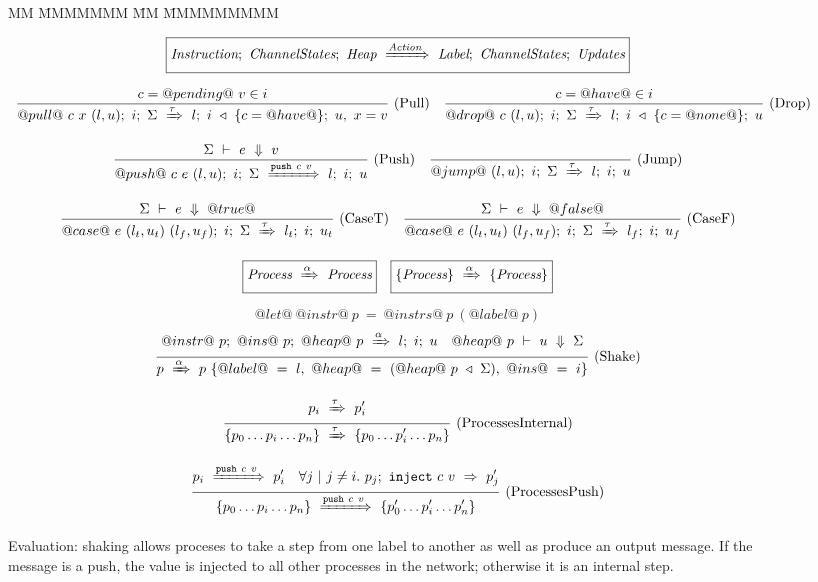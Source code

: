 \begin{figure}
\begin{tabbing}
MM \= MMMMMMM \= MM \= MMMMMMMMM\kill
\end{tabbing}

$$
  \boxed{
    \ProcBlockShake
      {\Instr}
      {\ChannelStates}
      {\Heap}
      {\Action}
      {\Label}
      {\ChannelStates}
      {\Updates}
  }
$$


$$
\ruleIN{
  c=@pending@~v \in i
}{
  \ProcBlockShake{@pull@~c~x~(l,u)}{i}{\Sigma}{\tau}{l}{\HeapUpdateOne{c}{@have@}{i}}{u,~x = v}
}{Pull}
\ruleIN{
  c=@have@ \in i
}{
  \ProcBlockShake{@drop@~c~(l,u)}{i}{\Sigma}{\tau}{l}{\HeapUpdateOne{c}{@none@}{i}}{u}
}{Drop}
$$

$$
\ruleIN{
  \ExpEval{\Sigma}{e}{v}
}{
  \ProcBlockShake{@push@~c~e~(l,u)}{i}{\Sigma}{\Push~c~v}{l}{i}{u}
}{Push}
\ruleIN{
}{
  \ProcBlockShake{@jump@~(l,u)}{i}{\Sigma}{\tau}{l}{i}{u}
}{Jump}
$$

$$
\ruleIN{
  \ExpEval{\Sigma}{e}{@true@}
}{
  \ProcBlockShake{@case@~e~(l_t,u_t)~(l_f,u_f)}{i}{\Sigma}{\tau}{l_t}{i}{u_t}
}{CaseT}
\ruleIN{
  \ExpEval{\Sigma}{e}{@false@}
}{
  \ProcBlockShake{@case@~e~(l_t,u_t)~(l_f,u_f)}{i}{\Sigma}{\tau}{l_f}{i}{u_f}
}{CaseF}
$$

$$
  \boxed{\ProcShake{\Proc}{\alpha}{\Proc}}
  \quad
  \boxed{\ProcsShake{\sgl{\Proc}}{\alpha}{\sgl{\Proc}}}
$$

$$
@let@~@instr@~p~=~@instrs@~p~(@label@~p)
$$
$$
\ruleIN{
  \ProcBlockShake
    {@instr@~p} {@ins@~p}{@heap@~p}
    {\alpha}
    {l}{i}{u}
  \quad
    \ExpEval{@heap@~p}{u}{\Sigma}
}{
  \ProcShake{p}{\alpha}{p~\sgl{@label@~=~l,~@heap@~=~(\HeapUpdates{\Sigma}{@heap@~p}),~@ins@~=~i}}
}{Shake}
$$




$$
\ruleIN{
  \ProcShake{p_i}{\tau}{p'_i}
}{
  \ProcsShake{
    \sgl{p_0 \ldots p_i \ldots p_n}
  }{\tau}{
    \sgl{p_0 \ldots p'_i \ldots p_n}
  }
}{ProcessesInternal}
$$

$$
\ruleIN{
  \ProcShake{p_i}{\Push~c~v}{p'_i}
  \quad
  \forall j~|~j \neq i.~
  \ProcInject{p_j}{c}{v}{p'_j}
}{
  \ProcsShake{
    \sgl{p_0 \ldots p_i \ldots p_n}
  }{\Push~c~v}{
    \sgl{p'_0 \ldots p'_i \ldots p'_n}
  }
}{ProcessesPush}
$$


\caption{Evaluation: shaking allows proceses to take a step from one label to another as well as produce an output message.
If the message is a push, the value is injected to all other processes in the network; otherwise it is an internal step.}
\label{fig:Process:Eval:Shake}
\end{figure}

